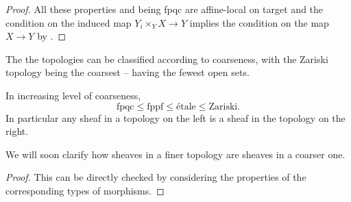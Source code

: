 \begin{proof}
    All these properties and being fpqc are affine-local on target and the condition on the induced map $Y_{i}\times_{Y}X\to Y$ implies the condition on the map $X\to Y$ by \cite[Prop. 2.7.1]{EGAIVpt1}. 
\end{proof}
The the topologies can be classified according to coarseness, with the Zariski topology being the coarsest -- having the fewest open sets. 
\begin{theorem}\label{thm: classification of Grothendieck topologies on cat of schemes}
    In increasing level of coarseness, 
    $$\text{fpqc}\leq\text{fppf}\leq\text{\'{e}tale}\leq\text{Zariski}.$$
    In particular any sheaf in a topology on the left is a sheaf in the topology on the right. 
\end{theorem}
\begin{remark}
    We will soon clarify how sheaves in a finer topology are sheaves in a coarser one. 
\end{remark}
\begin{proof}
    This can be directly checked by considering the properties of the corresponding types of morphisms. 
\end{proof}
